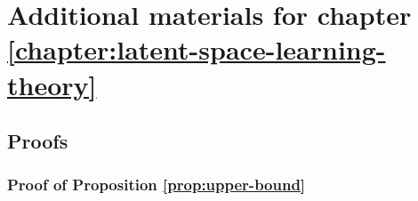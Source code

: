 
\ifpdf
    \graphicspath{{Appendix3/Figs/Raster/}{Appendix3/Figs/PDF/}{Appendix3/Figs/}}
\else
    \graphicspath{{Appendix3/Figs/Vector/}{Appendix3/Figs/}}
\fi


\chapter{Additional materials for chapter \ref{chapter:latent-space-learning-theory}}\label{chapter:appendix-latex-space-learning-theory}

\section{Proofs}\label{appendix:proofs}

\subsection{Proof of Proposition \ref{prop:upper-bound}}\label{proof:prop1}

